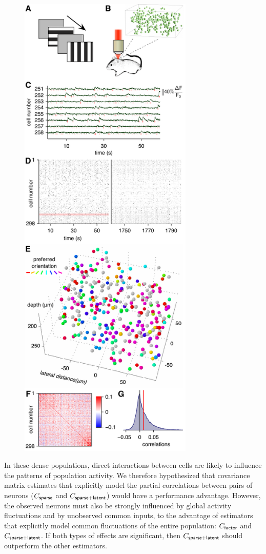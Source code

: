 \documentclass[10pt]{article}
\begin{document}
\begin{figure}
    {\includegraphics[width=8.3cm]{figures/Figure03.pdf}}
\end{figure}

In these dense populations, direct interactions between cells are likely to influence the patterns of population activity.  We therefore hypothesized that covariance matrix estimates that explicitly model the partial correlations between pairs of neurons ($C_{\sf sparse}$ and $C_{\sf sparse+latent}$) would have a performance advantage.  However, the observed neurons must also be strongly influenced by global activity fluctuations and by unobserved common inputs, to the advantage of estimators that explicitly model common fluctuations of the entire population: $C_{\sf factor}$ and $C_{\sf sparse+latent}$.  If both types of effects are significant, then $C_{\sf sparse+latent}$ should outperform the other estimators.
\end{document}

